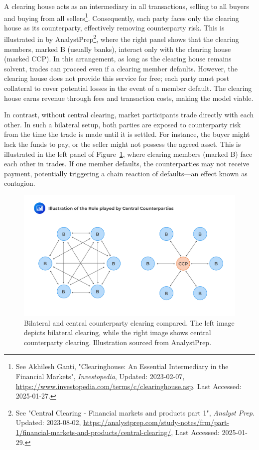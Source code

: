 A clearing house acts as an intermediary in all transactions, selling to all buyers and buying from all sellers\footnote{See Akhilesh Ganti, "Clearinghouse: An Essential Intermediary in the Financial Markets", \textit{Investopedia}, Updated: 2023-02-07, \url{https://www.investopedia.com/terms/c/clearinghouse.asp}. Last Accessed: 2025-01-27.}. Consequently, each party faces only the clearing house as its counterparty, effectively removing counterparty risk. This is illustrated in  by AnalystPrep\footnote{See "Central Clearing - Financial markets and products part 1", \textit{Analyst Prep}. Updated: 2023-08-02, \url{https://analystprep.com/study-notes/frm/part-1/financial-markets-and-products/central-clearing/}, Last Accessed: 2025-01-29.}, where the right panel shows that the clearing members, marked B (usually banks), interact only with the clearing house (marked CCP). In this arrangement, as long as the clearing house remains solvent, trades can proceed even if a clearing member defaults. However, the clearing house does not provide this service for free; each party must post collateral to cover potential losses in the event of a member default. The clearing house earns revenue through fees and transaction costs, making the model viable.

In contrast, without central clearing, market participants trade directly with each other. In such a bilateral setup, both parties are exposed to counterparty risk from the time the trade is made until it is settled. For instance, the buyer might lack the funds to pay, or the seller might not possess the agreed asset. This is illustrated in the left panel of Figure~\ref{fig:CCP}, where clearing members (marked B) face each other in trades. If one member defaults, the counterparties may not receive payment, potentially triggering a chain reaction of defaults—an effect known as contagion.





\begin{figure}[ht]
    \centering
    \includegraphics[width=0.7\linewidth]{1Introduction/pictures/CCPvisual .jpg}
    \caption{Bilateral and central counterparty clearing compared. The left image depicts bilateral clearing, while the right image shows central counterparty clearing. Illustration sourced from AnalystPrep\protect\footnotemark[\value{footnote}].}
    \label{fig:CCP}
\end{figure}

